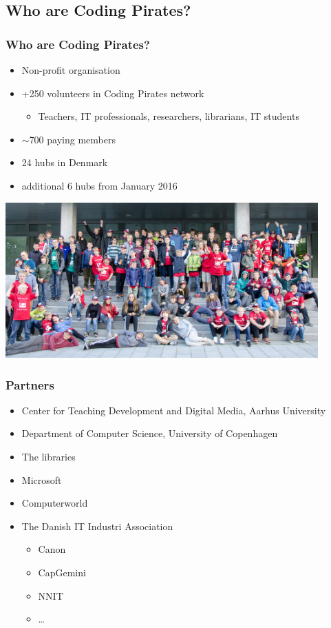 \documentclass{beamer}
\begin{document}
\subsection{Who are Coding Pirates?}
\begin{frame}
\frametitle{Who are Coding Pirates?}
\begin{itemize}
\item Non-profit organisation
\item +250 volunteers in Coding Pirates network
  \begin{itemize}
  \item Teachers, IT professionals, researchers, librarians, IT students
  \end{itemize}
\item $\sim$700 paying members
\item 24 hubs in Denmark
\item additional 6 hubs from January 2016
\end{itemize}

\centerline{\includegraphics[width=0.9\textwidth]{imagery/gamejam}}
\end{frame}

\begin{frame}
  \frametitle{Partners}

\begin{itemize}
\item Center for Teaching Development and Digital Media, Aarhus
  University
\item Department of Computer Science, University of Copenhagen
\item The libraries
\item Microsoft
\item Computerworld
\item The Danish IT Industri Association
  \begin{itemize}
  \item Canon
  \item CapGemini
  \item NNIT
  \item \ldots
  \end{itemize}
\end{itemize}
\end{frame}
\end{document}
